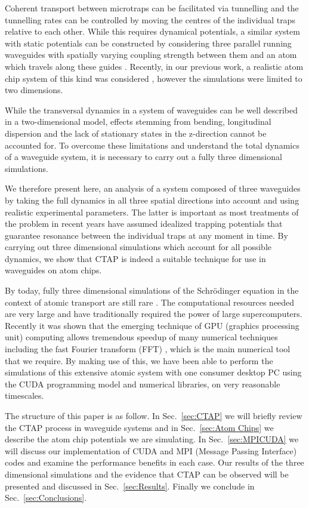 Coherent transport between microtraps can be facilitated via tunnelling and the tunnelling rates  can be controlled by moving the centres of the individual traps relative to each other. While this requires dynamical potentials, a similar system with static potentials can be constructed by considering three parallel running waveguides with spatially varying coupling strength between them  and an atom which travels along these guides \cite{Eckert:06}. Recently, in our previous work, a realistic atom chip system of this kind was considered \cite{OSullivan:10}, however the simulations were limited to two dimensions.

While the transversal dynamics in a system of waveguides can be well described in a two-dimensional model, effects stemming from bending, longitudinal dispersion and the lack of stationary states in the z-direction cannot be accounted for. To overcome these limitations and understand the total dynamics of a waveguide system, it is necessary to carry out a fully three dimensional simulations.

We therefore present here, an analysis of a system composed of three waveguides by taking the full dynamics in all three spatial directions into account and using realistic experimental parameters. The latter is important as most treatments of the problem in recent years have assumed idealized trapping potentials that guarantee resonance between the individual traps at any moment in time. By carrying out three dimensional simulations which account for all possible dynamics, we show that CTAP is indeed a suitable technique for use in waveguides on atom chips.

By today, fully three dimensional simulations of the Schr\"odinger equation in the context of atomic transport are still rare \cite{Rab:08}. The computational resources needed are very large and have traditionally required the power of  large supercomputers. Recently it was shown that the emerging technique of GPU (graphics processing unit) computing allows tremendous speedup of many numerical techniques including the fast Fourier transform (FFT) \cite{Bauke:11}, which is the main numerical tool that we require. By making use of this, we have been able to perform the simulations of this extensive atomic system with one consumer desktop PC using the CUDA programming model and numerical libraries, on very reasonable timescales.

The structure of this paper is as follow. In Sec.~\ref{sec:CTAP} we will briefly review the CTAP process in waveguide systems and in Sec.~\ref{sec:Atom Chips} we describe the atom chip potentials we are simulating. In Sec.~\ref{sec:MPICUDA} we will discuss our
implementation of CUDA and MPI (Message Passing Interface) codes and examine the performance benefits in each case.  Our results of the three dimensional simulations and the evidence that CTAP can be observed will be presented and discussed in Sec.~\ref{sec:Results}. Finally we conclude in Sec.~\ref{sec:Conclusions}.

